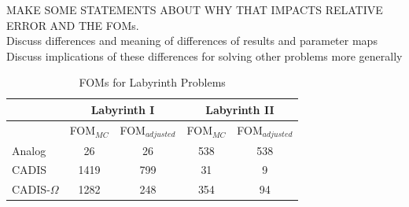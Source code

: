 \documentclass[12pt]{article}
\begin{document}
MAKE SOME STATEMENTS ABOUT WHY THAT IMPACTS RELATIVE ERROR AND THE FOMs.\\
Discuss differences and meaning of differences of results and parameter maps \\
Discuss implications of these differences for solving other problems more generally


 \begin{table}
  \centering
  \caption{\label{tab:FOMLabI}FOMs for Labyrinth Problems}
  \begin{tabular}{l|cc|cc}
    \toprule
        & \multicolumn{2}{c}{Labyrinth I} & \multicolumn{2}{c}{Labyrinth II}  \\
    \hline
        & FOM$_{MC}$ & FOM$_{adjusted}$ & FOM$_{MC}$ & FOM$_{adjusted}$ \\
    \hline
    Analog           & 26    &  26  & 538 & 538 \\ 
    CADIS            & 1419  &  799 & 31  &  9  \\
    CADIS-$\Omega$   & 1282  &  248 & 354 & 94  \\  
	\bottomrule
  \end{tabular}
\end{table}

\end{document}
